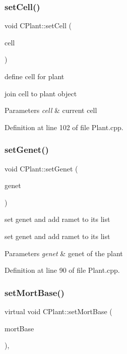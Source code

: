 \subsubsection{\texorpdfstring{setCell()}{setCell()}}
{\footnotesize\ttfamily void C\+Plant\+::set\+Cell (\begin{DoxyParamCaption}\item[{\mbox{\hyperlink{class_c_cell}{C\+Cell}} $\ast$}]{cell }\end{DoxyParamCaption})}



define cell for plant 

join cell to plant object


\begin{DoxyParams}{Parameters}
{\em cell} & current cell \\
\hline
\end{DoxyParams}


Definition at line 102 of file Plant.\+cpp.

\mbox{\label{class_c_plant_a214050cfb40ec3f179633ba29e594ddf}} 
\subsubsection{\texorpdfstring{setGenet()}{setGenet()}}
{\footnotesize\ttfamily void C\+Plant\+::set\+Genet (\begin{DoxyParamCaption}\item[{\mbox{\hyperlink{class_c_genet}{C\+Genet}} $\ast$}]{genet }\end{DoxyParamCaption})}



set genet and add ramet to its list 

set genet and add ramet to its list 
\begin{DoxyParams}{Parameters}
{\em genet} & genet of the plant \\
\hline
\end{DoxyParams}


Definition at line 90 of file Plant.\+cpp.

\mbox{\label{class_c_plant_a6e71f471594572aee0216d0958b893e8}} 
\subsubsection{\texorpdfstring{setMortBase()}{setMortBase()}}
{\footnotesize\ttfamily virtual void C\+Plant\+::set\+Mort\+Base (\begin{DoxyParamCaption}\item[{double}]{mort\+Base }\end{DoxyParamCaption})\hspace{0.3cm}{\ttfamily [inline]}, {\ttfamily [virtual]}}

